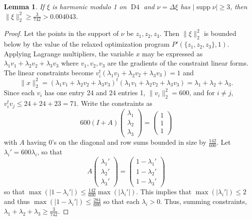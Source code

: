 \documentclass[a4paper, 12pt, notitlepage]{amsart}
\newcommand{\Dfour}{\operatorname{D4}}
\newcommand{\supp}{\operatorname{supp}}
\newtheorem{lemma}[theorem]{Lemma}
\theoremstyle{remark}
\begin{document}
 
\begin{lemma}\label{3_pt_support_lemma}
 If $\xi$ is harmonic modulo 1 on $\Dfour$ and $\nu = \Delta \xi$ has $|\supp \nu| \geq 3$, then $\|\xi\|_2^2 \geq \frac{3}{742} > 0.004043$.
\end{lemma}

\begin{proof}
 Let the points in the support of $\nu$ be $z_1, z_2, z_3$.  Then $\|\xi\|_2^2$ is bounded below by the value of the relaxed optimization program $P'(\{z_1, z_2, z_3\}, 1)$.  
 Applying Lagrange multipliers, the variable $x$ may be expressed as $\lambda_1 v_1 + \lambda_2 v_2 + \lambda_3 v_3$ where $v_1, v_2, v_3$ are the gradients of the constraint linear forms.  The linear constraints become $v_i^t (\lambda_1 v_1 + \lambda_2 v_2 + \lambda_3 v_3) = 1$ and 
 \begin{equation}
  \|x\|_2^2 = (\lambda_1 v_1 + \lambda_2 v_2 + \lambda_3 v_3)^t(\lambda_1 v_1 + \lambda_2 v_2 + \lambda_3 v_3) = \lambda_1 + \lambda_2 + \lambda_3.
 \end{equation}
 Since each $v_i$ has one entry 24 and 24 entries 1, $\|v_i\|_2^2 = 600$, and for $i \neq j$, $v_i^t v_j \leq 24+ 24+23 = 71$.
 Write the constraints as
 \begin{equation}
  600 (I + A) \begin{pmatrix} \lambda_1\\ \lambda_2 \\ \lambda_3 \end{pmatrix} = \begin{pmatrix} 1\\ 1\\1 \end{pmatrix}
 \end{equation}
with $A$ having 0's on the diagonal and row sums bounded in size by $\frac{142}{600}$.  Let $\lambda_i' = 600 \lambda_i$, so that
\begin{equation}
 A\begin{pmatrix} \lambda_1'\\ \lambda_2' \\ \lambda_3' \end{pmatrix} = \begin{pmatrix} 1-\lambda_1'\\ 1-\lambda_2'\\1-\lambda_3' \end{pmatrix}
\end{equation}
so that $ \max(|1-\lambda_i'|) \leq \frac{142}{600} \max(|\lambda_i'|)$.  This implies that $\max(|\lambda_i'|) \leq 2$ and thus $\max(|1-\lambda_i'|) \leq \frac{284}{600}$ so that each $\lambda_i > 0$.
Thus, summing constraints, $\lambda_1 + \lambda_2 + \lambda_3 \geq \frac{3}{742}.$\end{proof}
\end{document}
